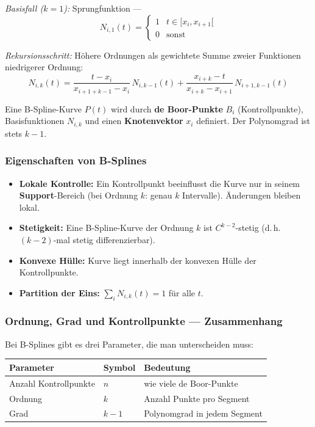 \documentclass[12pt, a4paper]{article}
\begin{document}
\textit{Basisfall ($k=1$):} Sprungfunktion —
\[
  N_{i,1}(t) = \begin{cases} 1 & t \in [x_i, x_{i+1}[ \\ 0 & \text{sonst} \end{cases}
\]

\textit{Rekursionsschritt:} Höhere Ordnungen als gewichtete Summe zweier Funktionen niedrigerer Ordnung:
\[
  N_{i,k}(t) = \frac{t - x_i}{x_{i+1+k-1} - x_i}\,N_{i,k-1}(t) + \frac{x_{i+k} - t}{x_{i+k} - x_{i+1}}\,N_{i+1,k-1}(t)
\]

Eine B-Spline-Kurve $P(t)$ wird durch \textbf{de Boor-Punkte} $B_i$ (Kontrollpunkte), Basisfunktionen $N_{i,k}$ und einen \textbf{Knotenvektor} $x_i$ definiert. Der Polynomgrad ist stets $k-1$.

\subsubsection*{Eigenschaften von B-Splines}

\begin{itemize}
  \item \textbf{Lokale Kontrolle:} Ein Kontrollpunkt beeinflusst die Kurve nur in seinem \textbf{Support}-Bereich (bei Ordnung $k$: genau $k$ Intervalle). Änderungen bleiben lokal.
  \item \textbf{Stetigkeit:} Eine B-Spline-Kurve der Ordnung $k$ ist $C^{k-2}$-stetig (d.\,h.\ $(k{-}2)$-mal stetig differenzierbar).
  \item \textbf{Konvexe Hülle:} Kurve liegt innerhalb der konvexen Hülle der Kontrollpunkte.
  \item \textbf{Partition der Eins:} $\sum_i N_{i,k}(t) = 1$ für alle $t$.
\end{itemize}

\subsubsection*{Ordnung, Grad und Kontrollpunkte — Zusammenhang}

Bei B-Splines gibt es drei Parameter, die man unterscheiden muss:

\begin{center}
\begin{tabular}{lll}
  \textbf{Parameter} & \textbf{Symbol} & \textbf{Bedeutung} \\
  \hline
  Anzahl Kontrollpunkte & $n$ & wie viele de Boor-Punkte \\
  Ordnung & $k$ & Anzahl Punkte pro Segment \\
  Grad & $k-1$ & Polynomgrad in jedem Segment \\
\end{tabular}
\end{center}
\end{document}
